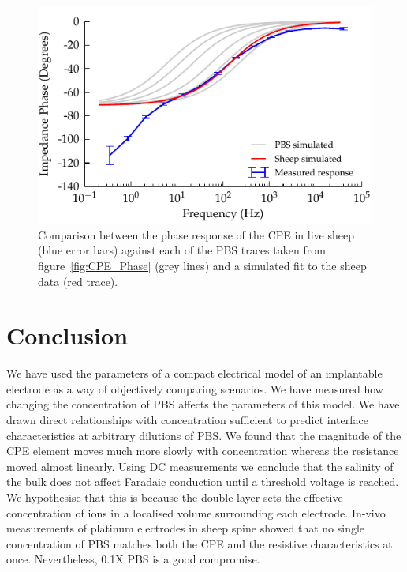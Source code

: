 \documentclass[journal, a4paper]{IEEEtran}
\begin{document}
\begin{figure}
    \begin{center}
        \includegraphics{graphics/displacement-withSheep_impedanceVsFrequency_phase}
    \end{center}
    \caption{Comparison between the phase response of the CPE in live sheep (blue error bars) against each of the PBS traces taken from figure~\ref{fig:CPE_Phase} (grey lines) and a simulated fit to the sheep data (red trace).}
    \label{fig:displacement_sheepCPEPhase}
\end{figure}

\section{Conclusion}

We have used the parameters of a compact electrical model of an implantable electrode as a way of objectively comparing scenarios.
We have measured how changing the concentration of PBS affects the parameters of this model.
We have drawn direct relationships with concentration sufficient to predict interface characteristics at arbitrary dilutions of PBS.
We found that the magnitude of the CPE element moves much more slowly with concentration whereas the resistance moved almost linearly.
Using DC measurements we conclude that the salinity of the bulk does not affect Faradaic conduction until a threshold voltage is reached. We hypothesise that this is because the double-layer sets the effective concentration of ions in a localised volume surrounding each electrode. In-vivo measurements of platinum electrodes in sheep spine showed that no single concentration of PBS matches both the CPE and the resistive characteristics at once. Nevertheless, 0.1X PBS is a good compromise.
\end{document}
